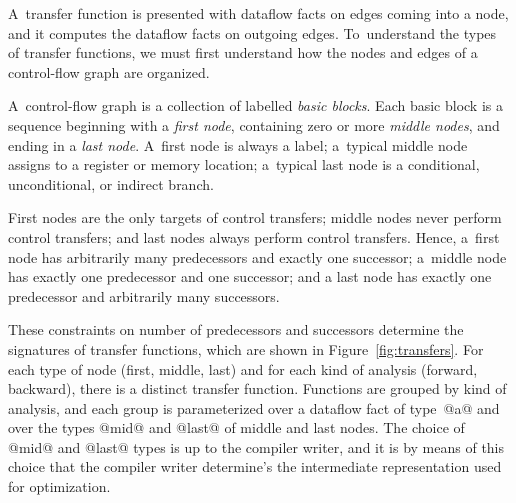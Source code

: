 \documentclass[blockstyle,preprint,nocopyrightspace]{sigplanconf}
\newcommand{\authornote}[1]{{\em #1}}
\def\authornote#1{\unskip\relax}
\newcommand{\norman}[1]{\authornote{NR: #1}}
\let\remark\norman
\newcommand\figref[1]{Figure~\ref{fig:#1}}
\begin{document}
A~transfer function is presented with dataflow facts on edges coming
into a node, and it computes the dataflow facts on outgoing edges.
To~understand the types of transfer functions, we must first
understand how the nodes and edges of a control-flow graph are organized.

A~control-flow graph is a collection of labelled \emph{basic blocks}.
Each basic block is a sequence beginning with a \emph{first node},
containing zero or more \emph{middle nodes},
and ending in a \emph{last node}.
A~first node is always a label;
a~typical middle node assigns to a register or memory
location;
a~typical last node is a conditional, unconditional, or indirect branch.
\remark{Forward reference?}

First nodes are the only targets of control transfers;
middle nodes never perform control transfers;
and last nodes always perform control transfers.
Hence, a~first node has arbitrarily many predecessors and exactly one
successor;
a~middle node has exactly one predecessor and one successor;
and a last node has exactly one predecessor and arbitrarily many
successors. 

These constraints on number of predecessors and successors determine
the signatures of 
transfer functions, 
which are shown in \figref{transfers}.
For each type of node (first, middle, last) and for each kind of
analysis (forward, backward), there is a distinct transfer function.
Functions are grouped by kind of analysis, and each group is
parameterized over a dataflow fact of type~@a@ and over the types
@mid@ and @last@ of middle and last nodes.  
The choice of  @mid@ and
@last@ types is up to the compiler writer, and it is by means of this
choice that the compiler writer determine's the intermediate
representation used for optimization.
\norman{We are having trouble understanding SLPJ's obsession with
distinguishing the ``client'' (an entity we wish not to name) from the
``library'' (another entity we wish not to name} 
\end{document}
